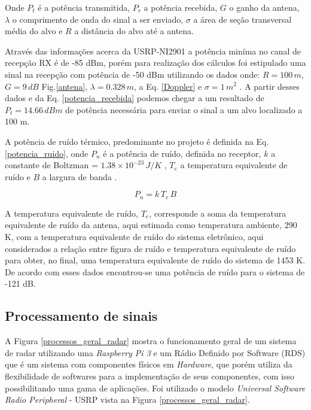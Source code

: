 Onde $P_t$ é a potência transmitida, $P_r$ a potência recebida, $G$ o ganho da antena, $\lambda$ o comprimento de onda do sinal a ser enviado, $\sigma$ a área de seção transversal média do alvo e $R$ a distância do alvo até a antena.

Através das informações acerca da USRP-NI2901 \cite{rds} a potência miníma no canal de recepção RX é de -85 dBm, porém para realização dos cálculos foi estipulado uma sinal na recepção com potência de -50 dBm utilizando os dados onde: $R=100 \, m$, $G=9 \, dB$ Fig.\ref{antena}, $\lambda=0.328 \, m$, a Eq. \ref{Doppler} e $\sigma=1 \, m^{2}$ \cite{richards2010principles}. A partir desses dados e da Eq. \ref{potencia_recebida} podemos chegar a um resultado de $P_t=14.66 \, dBm$ de potência necessária para enviar o sinal a um alvo localizado a 100 m.

A potência de ruído térmico, predominante no projeto é definida na Eq. \ref{potencia_ruido}, onde $P_n$ é a potência de ruído, definida no receptor, $k$ a constante de Boltzman = $1.38 \times 10^{-23} \, J/K$ , $T_e$ a temperatura equivalente de ruído e $B$ a largura de banda \cite{richards2010principles}.

\begin{equation}\label{potencia_ruido}
    P_n = k\, T_e\,B
\end{equation}

A temperatura equivalente de ruído, $T_e$, corresponde a soma da temperatura equivalente de ruído da antena, aqui estimada como temperatura ambiente, 290 K, com a temperatura equivalente de ruído do sistema eletrônico, aqui considerados a relação entre figura de ruído e temperatura equivalente de ruído para obter, no final, uma temperatura equivalente de ruído do sistema de 1453 K. De acordo com esses dados encontrou-se uma potência de ruído para o sistema de -121 dB.

\subsection{Processamento de sinais}

A Figura \ref{processos_geral_radar} mostra o funcionamento geral de um sistema de radar utilizando uma \emph{Raspberry Pi 3} e um Rádio Definido por Software (RDS) que é um sistema com componentes físicos em  \emph{Hardware}, que porém utiliza da flexibilidade de softwares para a implementação  de seus componentes, com isso possibilitando uma gama de aplicações. Foi utilizado o  modelo \emph{Universal Software Radio Peripheral} - USRP vista na Figura \ref{processos_geral_radar}.




